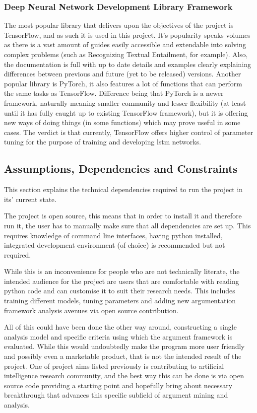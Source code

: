        \subsubsection{Deep Neural Network Development Library Framework}
            The most popular library that delivers upon the objectives of the project is TensorFlow, and as such it is used in this project. It's popularity speaks volumes as there is a vast amount of guides easily accessible and extendable into solving complex problems (such as Recognizing Textual Entailment, for example). Also, the documentation is full with up to date details and examples clearly explaining differences between previous and future (yet to be released) versions. Another popular library is PyTorch, it also features a lot of functions that can perform the same tasks as TensorFlow. Difference being that PyTorch is a newer framework, naturally meaning smaller community and lesser flexibility (at least until it has fully caught up to existing TensorFlow framework), but it is offering new ways of doing things (in some functions) which may prove useful in some cases. The verdict is that currently, TensorFlow offers higher control of parameter tuning for the purpose of training and developing \gls{lstm} networks.
        
    \subsection{Assumptions, Dependencies and Constraints} \label{assumptionsdependencies}
        This section explains the technical dependencies required to run the project in its' current state.
        
        The project is open source, this means that in order to install it and therefore run it, the user has to manually make sure that all dependencies are set up. This requires knowledge of command line interfaces, having python installed, integrated development environment (of choice) is recommended but not required.
        
        While this is an inconvenience for people who are not technically literate, the intended audience for the project are users that are comfortable with reading python code and can customise it to suit their research needs. This includes training different models, tuning parameters and adding new argumentation framework analysis avenues via open source contribution.
        
        All of this could have been done the other way around, constructing a single analysis model and specific criteria using which the argument framework is evaluated. While this would undoubtedly make the program more user friendly and possibly even a marketable product, that is not the intended result of the project. One of project aims listed previously is contributing to artificial intelligence research community, and the best way this can be done is via open source code providing a starting point and hopefully bring about necessary breakthrough that advances this specific subfield of argument mining and analysis.
        
